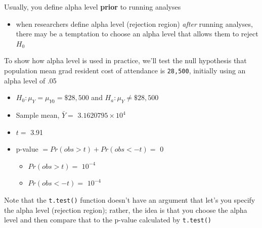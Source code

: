 \documentclass[
  letterpaper,
  DIV=11,
  numbers=noendperiod]{scrartcl}
\newenvironment{Shaded}{\begin{snugshade}}{\end{snugshade}}
\newcommand{\AttributeTok}[1]{\textcolor[rgb]{0.40,0.45,0.13}{#1}}
\newcommand{\CommentTok}[1]{\textcolor[rgb]{0.37,0.37,0.37}{#1}}
\newcommand{\DecValTok}[1]{\textcolor[rgb]{0.68,0.00,0.00}{#1}}
\newcommand{\FunctionTok}[1]{\textcolor[rgb]{0.28,0.35,0.67}{#1}}
\newcommand{\NormalTok}[1]{\textcolor[rgb]{0.00,0.23,0.31}{#1}}
\newcommand{\SpecialCharTok}[1]{\textcolor[rgb]{0.37,0.37,0.37}{#1}}
\providecommand{\tightlist}{%
  \setlength{\itemsep}{0pt}\setlength{\parskip}{0pt}}\usepackage{longtable,booktabs,array}
\begin{document}
Usually, you define alpha level \textbf{prior} to running analyses

\begin{itemize}
\tightlist
\item
  when researchers define alpha level (rejection region) \emph{after}
  running analyses, there may be a temptation to choose an alpha level
  that allows them to reject \(H_0\)
\end{itemize}

To show how alpha level is used in practice, we'll test the null
hypothesis that population mean grad resident cost of attendance is
\texttt{28,500}, initially using an alpha level of .05

\begin{itemize}
\tightlist
\item
  \(H_0: \mu_Y = \mu_{Y0} = \$28,500\) and \(H_a: \mu_Y \neq \$28,500\)
\item
  Sample mean, \(\bar{Y} =\) \ensuremath{3.1620795\times 10^{4}}
\item
  \(t =\) 3.91
\item
  p-value \(= Pr(obs > t) + Pr(obs< -t) =\) 0

  \begin{itemize}
  \tightlist
  \item
    \(Pr(obs>t)=\) \ensuremath{10^{-4}}
  \item
    \(Pr(obs<-t)=\) \ensuremath{10^{-4}}
  \end{itemize}
\end{itemize}

Note that the \texttt{t.test()} function doesn't have an argument that
let's you specify the alpha level (rejection region); rather, the idea
is that you choose the alpha level and then compare that to the p-value
calculated by \texttt{t.test()}

\begin{Shaded}
\end{Shaded}
\end{document}
